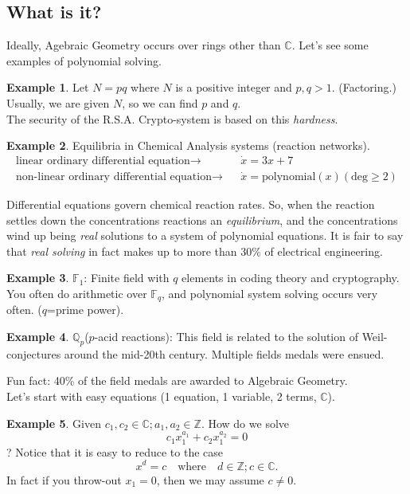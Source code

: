 \documentclass[]{article}
\theoremstyle{definition}
\newtheorem{ex}{Example}[section]
\begin{document}
		\subsection{What is it?}
		Ideally, Agebraic Geometry occurs over rings other than $\mathbb{C}$. Let's see some examples of polynomial solving.
			\begin{ex}
			Let $N=pq$ where $N$ is a positive integer and $p,q >1$. (Factoring.)
			Usually, we are given $N$, so we can find $p$ and $q$.\\
			The security of the R.S.A. Crypto-system is based on this \emph{hardness}.
			\end{ex}
			\begin{ex}
			Equilibria in Chemical Analysis systems (reaction networks).
			\begin{align*}
			\text{linear ordinary differential equation} \to &&\dot{x} = 3x+7\\
			\text{non-linear ordinary differential equation} \to &&\dot{x} = \text{polynomial}(x) (\text{deg}\geq 2)
			\end{align*}
			\end{ex}
			Differential equations govern chemical reaction rates. So, when the reaction settles down the concentrations reactions an \emph{equilibrium}, and the concentrations wind up being \emph{real} solutions to a system of polynomial equations.
			It is fair to say that \emph{real solving} in fact makes up to more than 30\% of electrical engineering.
			\begin{ex}
			$\mathbb{F}_1$: Finite field with $q$ elements in coding theory and cryptography. You often do arithmetic over $\mathbb{F}_q$, and polynomial system solving occurs very often. ($q$=prime power).
			\end{ex}
			\begin{ex}
			$\mathbb{Q}_p$($p$-acid reactions): This field is related to the solution of Weil-conjectures around the mid-20th century. Multiple fields medals were ensued.\\
			\end{ex}
			Fun fact: 40\% of the field medals are awarded to Algebraic Geometry.
			\\
			Let's start with easy equations (1 equation, 1 variable, 2 terms, $\mathbb{C}$).
			\begin{ex}
			Given $c_1,c_2 \in \mathbb{C}; a_1,a_2 \in \mathbb{Z}$. How do we solve
			\[ c_1x_1^{a_1}+c_2x_1^{a_2}=0\]?
			Notice that it is easy to reduce to the case
			\[ x^d=c \quad \text{where} \quad d\in\mathbb{Z}; c\in \mathbb{C}.\]
			In fact if you throw-out $x_1=0$, then we may assume $c\neq0$.
			\end{ex}
\end{document}
